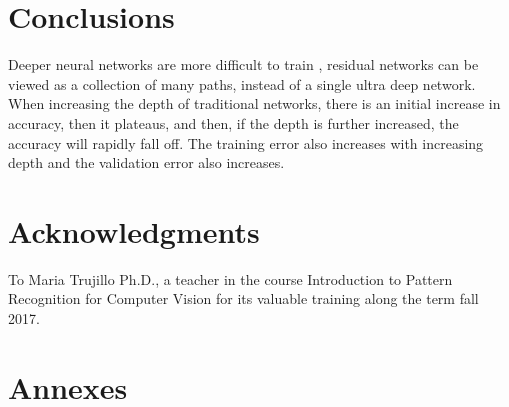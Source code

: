 \documentclass[12pt]{article}
\numberwithin{equation}{section}
\numberwithin{table}{section}
\numberwithin{figure}{section}
\begin{document}
\section{Conclusions}

Deeper neural networks are more difficult to train \cite{Zagoruyko2016}, residual networks can be viewed as a collection of many paths, instead of a single ultra deep network. When increasing the depth of traditional networks, there is an initial increase in accuracy, then it plateaus, and then, if the depth is further increased, the accuracy will rapidly fall off. The training error also increases with increasing depth and the validation error also increases.



\section*{Acknowledgments}

To Maria Trujillo Ph.D., a teacher in the course Introduction to Pattern Recognition for Computer Vision for its valuable training along the term fall 2017.
 





\newpage

\section*{Annexes}
\thispagestyle{empty}
\end{document}
